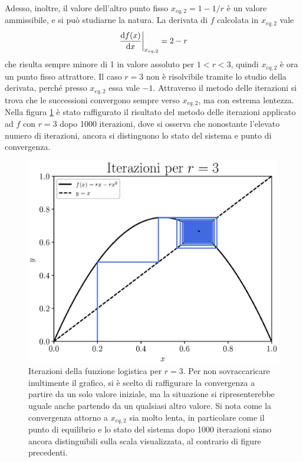 Adesso, inoltre, il valore dell'altro punto fisso $x_{eq,2} = 1 - 1/r$ è un valore ammissibile, e si può studiarne la natura. La derivata di $f$ calcolata in $x_{eq,2}$ vale $$ \left.\dfrac{\dif f(x)}{\dif x}\right\vert_{x_{eq,2}} = 2 -r$$ 
che risulta sempre minore di 1 in valore assoluto per $1 < r < 3$, quindi $x_{eq,2}$ è ora un punto fisso attrattore. 
Il caso $r=3$ non è risolvibile tramite lo studio della derivata, perché presso $x_{eq,2}$ essa vale $-1$. Attraverso il metodo delle iterazioni si trova che le successioni convergono sempre verso $x_{eq,2}$, ma con estrema lentezza. Nella figura \ref{fig:r3} è stato raffigurato il risultato del metodo delle iterazioni applicato ad $f$ con $r=3$ dopo 1000 iterazioni, dove si osserva che nonostante l'elevato numero di iterazioni, ancora si distinguono lo stato del sistema e punto di convergenza.
\begin{figure}[h!]
    \begin{center}  
    \includegraphics[scale=0.65]{Immagini/iterazioni_r3.eps} 
    \captionsetup{width=.8\linewidth}
    \caption{Iterazioni della funzione logistica per $r=3$. Per non sovraccaricare inultimente il grafico, si è scelto di raffigurare la convergenza a partire da un solo valore iniziale, ma la situazione si ripresenterebbe uguale anche partendo da un qualsiasi altro valore. Si nota come la convergenza attorno a $x_{eq,2}$ sia molto lenta, in particolare come il punto di equilibrio e lo stato del sistema dopo 1000 iterazioni siano ancora distinguibili sulla scala visualizzata, al contrario di figure precedenti.}
    \label{fig:r3}
    \end{center}   
\end{figure}

